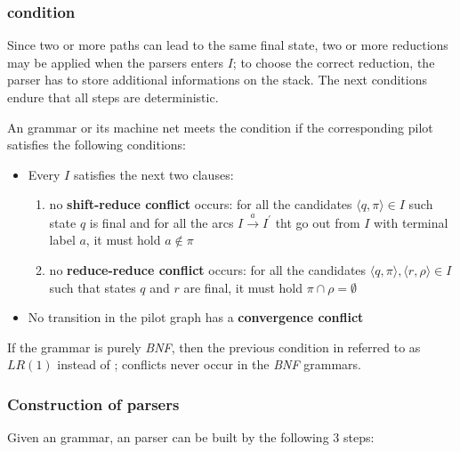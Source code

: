 \documentclass[english]{article}
\begin{document}
\subsubsection[ELR(1) condition]{\elro condition}
\label{sec:elro-condition}

Since two or more paths can lead to the same final state, two or more reductions may be applied when the parsers enters \mstate \(I\);
to choose the correct reduction, the parser has to store additional informations on the stack.
The next conditions endure that all steps are deterministic.

\bigskip
An \EBNF grammar or its machine net meets the condition \textbf{\elro} if the corresponding pilot satisfies the following conditions:

\begin{itemize}
  \item Every \mstate \(I\) satisfies the next two clauses:
        \begin{enumerate}
          \item no \textbf{shift-reduce conflict} occurs: for all the candidates \(\langle q, \pi \rangle \in I\) such state \(q\) is final and for all the arcs \(I \xrightarrow{a} I^\prime\) tht go out from \(I\) with terminal label \(a\), it must hold \(a \notin \pi\)
          \item no \textbf{reduce-reduce conflict} occurs: for all the candidates \(\langle q, \pi \rangle, \langle r, \rho \rangle \in I\) such that states \(q\) and \(r\) are final, it must hold \(\pi \cap \rho = \emptyset\)
        \end{enumerate}
  \item No transition in the pilot graph has a \textbf{convergence conflict}
\end{itemize}

If the grammar is purely \textit{BNF}, then the previous condition in referred to as \(\textit{LR}(1)\) instead of \elro;
conflicts never occur in the \textit{BNF} grammars.

\subsubsection[Construction of ELR(1) parser]{Construction of \elro parsers}

Given an \EBNF grammar, an \elro parser can be built by the following \(3\) steps:
\end{document}
